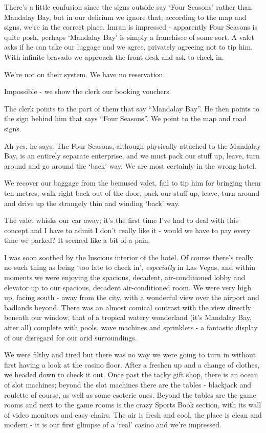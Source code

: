 \documentclass[a5paper,10pt,titlepage,draft]{book}
\begin{document}
There's a little confusion since the signs outside say `Four Seasons' rather than Mandalay Bay, but in our delirium we ignore that; according to the map and signs, we're in the correct place.  Imran is impressed - apparently Four Seasons is quite posh, perhaps `Mandalay Bay' is simply a franchisee of some sort.  A valet asks if he can take our luggage and we agree, privately agreeing not to tip him.  With infinite bravado we approach the front desk and ask to check in.

We're not on their system.  We have no reservation.

Impossible - we show the clerk our booking vouchers.

The clerk points to the part of them that say ``Mandalay Bay''.  He then points to the sign behind him that says ``Four Seasons''.  We point to the map and road signs.

Ah yes, he says.  The Four Seasons, although physically attached to the Mandalay Bay, is an entirely separate enterprise, and we must pack our stuff up, leave, turn around and go around the `back' way.  We are most certainly in the wrong hotel.

We recover our baggage from the bemused valet, fail to tip him for bringing them ten metres, walk right back out of the door, pack our stuff up, leave, turn around and drive up the strangely thin and winding `back' way.

The valet whisks our car away; it's the first time I've had to deal with this concept and I have to admit I don't really like it - would we have to pay every time we parked?  It seemed like a bit of a pain.

I was soon soothed by the luscious interior of the hotel.  Of course there's really no such thing as being `too late to check in', \emph{especially} in Las Vegas, and within moments we were enjoying the spacious, decadent, air-conditioned lobby and elevator up to our spacious, decadent air-conditioned room.  We were very high up, facing south - away from the city, with a wonderful view over the airport and badlands beyond.  There was an almost comical contrast with the view directly beneath our window, that of a tropical watery wonderland (it's Mandalay Bay, after all) complete with pools, wave machines and sprinklers - a fantastic display of our disregard for our arid surroundings.

We were filthy and tired but there was no way we were going to turn in without first having a look at the casino floor.  After a freshen up and a change of clothes, we headed down to check it out.  Once past the tacky gift shop, there is an ocean of slot machines; beyond the slot machines there are the tables - blackjack and roulette of course, as well as some esoteric ones.  Beyond the tables are the game rooms and next to the game rooms is the crazy Sports Book section, with its wall of video monitors and easy chairs.  The air is fresh and cool, the place is clean and modern - it is our first glimpse of a `real' casino and we're impressed.
\end{document}
